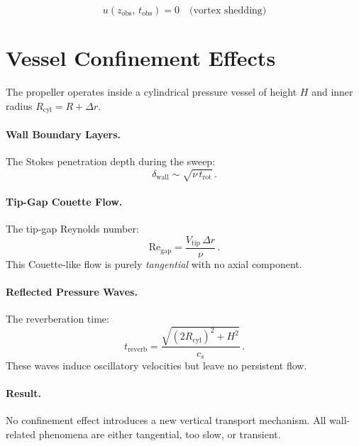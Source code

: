 \documentclass[11pt,a4paper]{article}
\begin{document}
\begin{equation}
  \boxed{u(z_\mathrm{obs},\, t_\mathrm{obs}) = 0
    \quad \text{(vortex shedding)}}
\end{equation}


\section{Vessel Confinement Effects}
\label{sec:confinement}

The propeller operates inside a cylindrical pressure vessel of height
$H$ and inner radius $R_\mathrm{cyl} = R + \Delta r$.

\paragraph{Wall Boundary Layers.}
The Stokes penetration depth during the sweep:
\begin{equation}
  \delta_\mathrm{wall} \sim \sqrt{\nu\, t_\mathrm{rot}}\,.
\end{equation}

\paragraph{Tip-Gap Couette Flow.}
The tip-gap Reynolds number:
\begin{equation}
  \mathrm{Re}_\mathrm{gap} = \frac{V_\mathrm{tip}\,\Delta r}{\nu}\,.
\end{equation}
This Couette-like flow is purely \emph{tangential} with no axial component.

\paragraph{Reflected Pressure Waves.}
The reverberation time:
\begin{equation}
  t_\mathrm{reverb} = \frac{\sqrt{(2R_\mathrm{cyl})^2 + H^2}}{c_s}\,.
\end{equation}
These waves induce oscillatory velocities but leave no persistent flow.

\paragraph{Result.}
No confinement effect introduces a new vertical transport mechanism.
All wall-related phenomena are either tangential, too slow, or transient.
\end{document}

